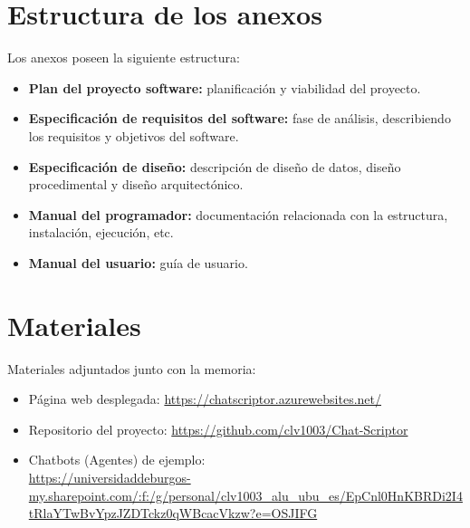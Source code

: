 \section{Estructura de los anexos}\label{estructura-de-los-anexos}
Los anexos poseen la siguiente estructura:
	\begin{itemize}
		\tightlist		
		\item
			\textbf{Plan del proyecto software: }
			planificación y viabilidad del proyecto.		
		\item
			\textbf{Especificación de requisitos del software: }
			fase de análisis, describiendo los requisitos y objetivos del software.		
		\item
			\textbf{Especificación de diseño: }
			descripción de diseño de datos, diseño procedimental y diseño arquitectónico.		
		\item
			\textbf{Manual del programador: }
			documentación relacionada con la estructura, instalación, ejecución, etc. 
		\item
			\textbf{Manual del usuario: }
			guía de usuario.	
	\end{itemize}

\section{Materiales}\label{materiales-adjuntos}
Materiales adjuntados junto con la memoria:
	\begin{itemize}
		\tightlist		
            \item 
                Página web desplegada: \url{https://chatscriptor.azurewebsites.net/}
            \item
                Repositorio del proyecto: \url{https://github.com/clv1003/Chat-Scriptor}
            \item Chatbots (Agentes) de ejemplo: \\
            \url{https://universidaddeburgos-my.sharepoint.com/:f:/g/personal/clv1003_alu_ubu_es/EpCnl0HnKBRDi2I4tRlaYTwBvYpzJZDTckz0qWBcacVkzw?e=OSJIFG}
	\end{itemize}